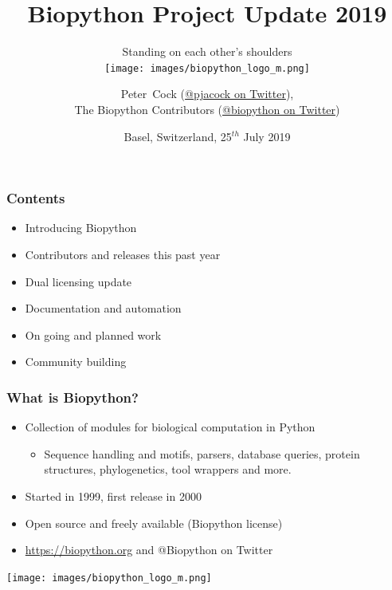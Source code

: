 

\usepackage{multicol}

\title[Biopython Project Update 2019] %
{Biopython Project Update 2019}
\subtitle{Standing on each other's shoulders \\ \texttt{[image: images/biopython\_logo\_m.png]}}
\author[Cock] %
{Peter~Cock (\href{https://twitter.com/pjacock}{@pjacock on Twitter}), \\
The Biopython Contributors (\href{https://twitter.com/Biopython}{@biopython on Twitter})}
\date[July 2019] %
{Basel, Switzerland, 25$^{th}$ July 2019}
\subject{Bioinformatics}



\frame[plain]{\titlepage}

\begin{frame}
\frametitle{Contents}
\begin{itemize}
\item Introducing Biopython
\item Contributors and releases this past year
\item Dual licensing update
\item Documentation and automation
\item On going and planned work
\item Community building
\end{itemize}
\end{frame}

\begin{frame}
  \frametitle{What is Biopython?}

  \begin{itemize}
  \item Collection of modules for biological computation in Python
  \begin{itemize}
  \item Sequence handling and motifs, parsers, database queries, protein structures, phylogenetics, tool wrappers and more.
  \end{itemize}
  \item Started in 1999, first release in 2000
  \item Open source and freely available (Biopython license)
  \item \url{https://biopython.org} and @Biopython on Twitter
  \end{itemize}

\center
\texttt{[image: images/biopython\_logo\_m.png]}
\end{frame}


